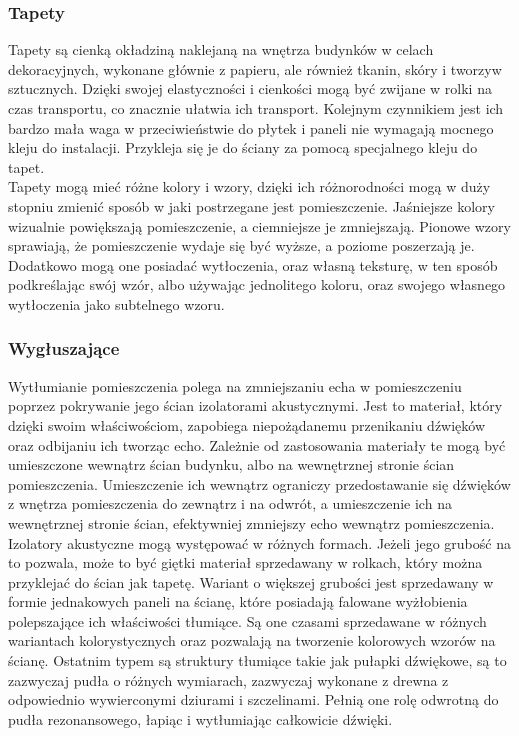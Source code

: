 \documentclass{article} %
\begin{document}
        \subsubsection{Tapety}
        Tapety są cienką okładziną naklejaną na wnętrza budynków w celach dekoracyjnych, wykonane głównie z papieru, ale również tkanin, skóry i tworzyw sztucznych. Dzięki swojej elastyczności i cienkości mogą być zwijane w rolki na czas transportu, co znacznie ułatwia ich transport. Kolejnym czynnikiem jest ich bardzo mała waga w przeciwieństwie do płytek i paneli nie wymagają mocnego kleju do instalacji. Przykleja się je do ściany za pomocą specjalnego kleju do tapet. 
        \\
        
        Tapety mogą mieć różne kolory i wzory, dzięki ich różnorodności mogą w duży stopniu zmienić sposób w jaki postrzegane jest pomieszczenie. Jaśniejsze kolory wizualnie powiększają pomieszczenie, a ciemniejsze je zmniejszają. Pionowe wzory sprawiają, że pomieszczenie wydaje się być wyższe, a poziome poszerzają je. Dodatkowo mogą one posiadać wytłoczenia, oraz własną teksturę, w ten sposób podkreślając swój wzór, albo używając jednolitego koloru, oraz swojego własnego wytłoczenia jako subtelnego wzoru. 
        \\
        
        \subsubsection{Wygłuszające}
        Wytłumianie pomieszczenia polega na zmniejszaniu echa w pomieszczeniu poprzez pokrywanie jego ścian izolatorami akustycznymi. Jest to materiał, który dzięki swoim właściwościom, zapobiega niepożądanemu przenikaniu dźwięków oraz odbijaniu ich tworząc echo. Zależnie od zastosowania materiały te mogą być umieszczone wewnątrz ścian budynku, albo na wewnętrznej stronie ścian pomieszczenia. Umieszczenie ich wewnątrz ograniczy przedostawanie się dźwięków z wnętrza pomieszczenia do zewnątrz i na odwrót, a umieszczenie ich na wewnętrznej stronie ścian, efektywniej zmniejszy echo wewnątrz pomieszczenia.
        \\
        
        Izolatory akustyczne mogą występować w różnych formach. Jeżeli jego grubość na to pozwala, może to być giętki materiał sprzedawany w rolkach, który można przyklejać do ścian jak tapetę. Wariant o większej grubości jest sprzedawany w formie jednakowych paneli na ścianę, które posiadają falowane wyżłobienia polepszające ich właściwości tłumiące. Są one czasami sprzedawane w różnych wariantach kolorystycznych oraz pozwalają na tworzenie kolorowych wzorów na ścianę. Ostatnim typem są struktury tłumiące takie jak pułapki dźwiękowe, są to zazwyczaj pudła o różnych wymiarach, zazwyczaj wykonane z drewna z odpowiednio wywierconymi dziurami i szczelinami. Pełnią one rolę odwrotną do pudła rezonansowego, łapiąc i wytłumiając całkowicie dźwięki.
        \\
        
\end{document}
